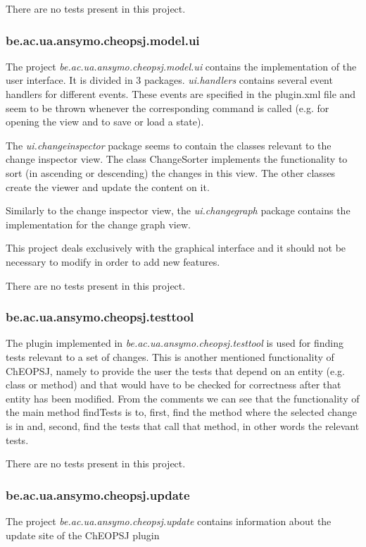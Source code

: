 \documentclass{article}
\begin{document}
There are no tests present in this project.

\subsubsection{be.ac.ua.ansymo.cheopsj.model.ui}
The project \emph{be.ac.ua.ansymo.cheopsj.model.ui} contains the implementation of the user interface. It is divided in 3 packages. \emph{ui.handlers} contains several event handlers for different events. These events are specified in the plugin.xml file and seem to be thrown whenever the corresponding command is called (e.g. for opening the view and to save or load a state).

The \emph{ui.changeinspector} package seems to contain the classes relevant to the change inspector view. The class ChangeSorter implements the functionality to sort (in ascending or descending) the changes in this view. The other classes create the viewer and update the content on it. 

Similarly to the change inspector view, the \emph{ui.changegraph} package contains the implementation for the change graph view.

This project deals exclusively with the graphical interface and it should not be necessary to modify in order to add new features.

There are no tests present in this project.

\subsubsection{be.ac.ua.ansymo.cheopsj.testtool}
The plugin implemented in \emph{be.ac.ua.ansymo.cheopsj.testtool} is used for finding tests relevant to a set of changes. This is another mentioned functionality of ChEOPSJ, namely to provide the user the tests that depend on an entity (e.g. class or method) and that would have to be checked for correctness after that entity has been modified. From the comments we can see that the functionality of the main method findTests is to, first, find the method where the selected change is in and, second, find the tests that call that method, in other words the relevant tests.

There are no tests present in this project.

\subsubsection{be.ac.ua.ansymo.cheopsj.update}
The project \emph{be.ac.ua.ansymo.cheopsj.update} contains information about the update site of the ChEOPSJ plugin
\end{document}
